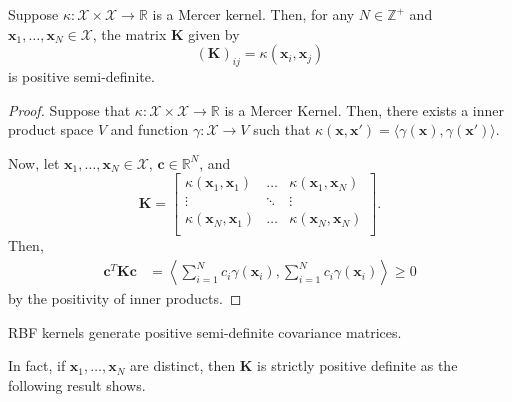 \begin{lemma}
    Suppose $\kappa: \mathcal{X} \times \mathcal{X} \to \mathbb{R}$ is a Mercer kernel.
    Then, for any $N \in \mathbb{Z}^{+}$ and $\mathbf{x}_1, \dots, \mathbf{x}_N \in \mathcal{X}$, the matrix $\mathbf{K}$
    given by
    \begin{equation*}
        (\mathbf{K})_{ij} = \kappa(\mathbf{x}_i, \mathbf{x}_j)
    \end{equation*}
    is positive semi-definite.
\end{lemma}
\begin{proof}
    Suppose that $\kappa: \mathcal{X} \times \mathcal{X} \to \mathbb{R}$ is a Mercer Kernel.
    Then, there exists a inner product space $V$ and function $\gamma: \mathcal{X} \to V$ such that $\kappa(\mathbf{x}, \mathbf{x}') = \langle\gamma(\mathbf{x}), \gamma(\mathbf{x}')\rangle$.

    Now, let $\mathbf{x}_1, \dots, \mathbf{x}_N \in \mathcal{X}$, $\mathbf{c} \in \mathbb{R}^{N}$, and
    \begin{equation*}
        \mathbf{K} =
        \begin{bmatrix}
            \kappa(\mathbf{x}_1, \mathbf{x}_1) & \dots & \kappa(\mathbf{x}_1, \mathbf{x}_N) \\
            \vdots & \ddots & \vdots \\
            \kappa(\mathbf{x}_N, \mathbf{x}_1) & \dots & \kappa(\mathbf{x}_N, \mathbf{x}_N) \\
        \end{bmatrix}
        .
    \end{equation*}
    Then,
    \begin{align*}
        \mathbf{c}^{T} \mathbf{K} \mathbf{c}
        & = \left\langle \sum_{i = 1}^{N}c_i \gamma(\mathbf{x}_i),
        \sum_{i = 1}^{N}c_i \gamma(\mathbf{x}_i) \right\rangle
        \geq 0
    \end{align*}
    by the positivity of inner products.
\end{proof}

\begin{corollary}
    \label{corr:rbf-psd}
    RBF kernels generate positive semi-definite covariance matrices.
\end{corollary}

In fact, if $\mathbf{x}_1, \dots, \mathbf{x}_N$ are distinct, then $\mathbf{K}$ is strictly positive definite as the following result shows.


